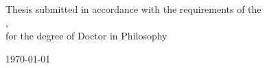 \begin{titlepage}
\begin{center}
\vspace{1.5cm}

\vfill

\large {Thesis submitted in accordance with the requirements of the\\}
\univname, \deptname \\
\large {for the degree of Doctor in Philosophy}

\vfill

{\large \today}\\[4.5cm] %

\vfill
\end{center}
\end{titlepage}